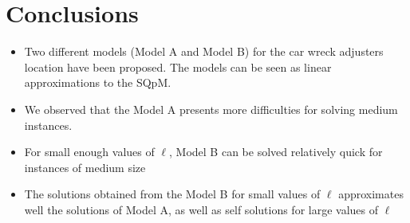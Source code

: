 
\section{Conclusions}
\begin{frame}
  
  \begin{itemize}
  \item Two different models (Model A and Model B) for the car wreck adjusters location have been proposed. 
    The models can be seen as linear approximations to the SQpM.
  \item We observed that the Model A presents more difficulties for solving medium instances.
  \item For small enough values of $\ell$, Model B can be solved relatively quick
    for instances of medium size
  \item The solutions obtained from the Model B for small values of $\ell$
    approximates well the solutions of Model A,
    as well as self solutions for large values of $\ell$
  \end{itemize}

\end{frame}
